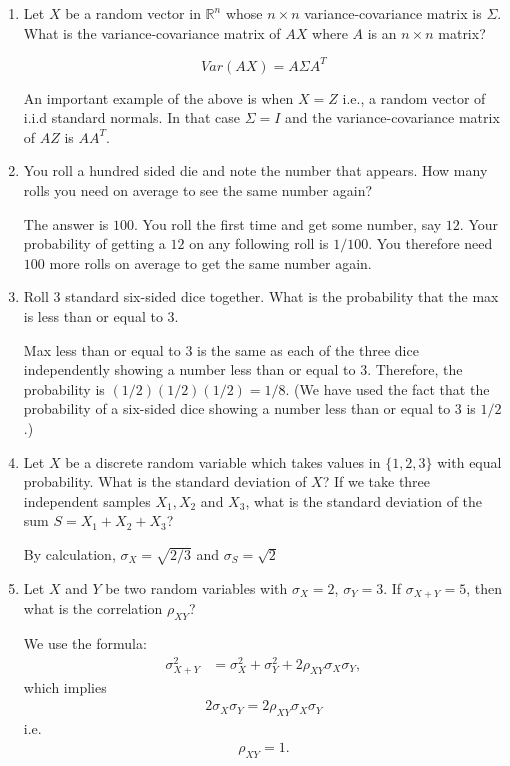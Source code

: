 \documentclass{amsart}
\theoremstyle{plain}
\numberwithin{equation}{section}
\begin{document}
\begin{enumerate}
\item Let $X$ be a random vector in $\mathbb{R}^n$ whose
$n \times n$ variance-covariance 
matrix is $\Sigma$. What is the variance-covariance matrix of 
$AX$ where $A$ is an $n \times n$ matrix?

\begin{equation*}
Var(AX) = A \Sigma A^{T}
\end{equation*}

An important example of the above is when $X=Z$ i.e.,
a random vector of i.i.d standard normals. In that case
$\Sigma = I$ and the variance-covariance matrix 
of $AZ$ is $AA^T$.

\item You roll a hundred sided die and note the number 
that appears. How many rolls you need on average 
to see the same number again?

The answer is $100$. You roll the first time and get 
some number, say $12$. Your probability of getting a $12$
on any following roll is $1/100$. You therefore need
$100$ more rolls on average to get the same number again. 

\item Roll $3$ standard six-sided dice together. What is the 
probability that the max is less than or equal to $3$.

Max less than or equal to $3$ is the same as each of the 
three dice independently showing a number less than or equal to $3$. 
Therefore, the probability is $(1/2)(1/2)(1/2) = 1/8$. (We have used the fact
that the probability of a six-sided dice showing a 
number less than or equal to $3$ is $1/2$.)

\item Let $X$ be a discrete random variable which
takes values in $\lbrace 1, 2, 3 \rbrace$ with 
equal probability. What is the standard deviation of $X$?
If we take three independent samples $X_1, X_2$ and 
$X_3$, what is the standard deviation of the sum 
$S = X_1 + X_2 + X_3$?

By calculation, $\sigma_X = \sqrt{2/3}$ and 
$\sigma_S = \sqrt{2}$

\item Let $X$ and $Y$ be two random variables with
$\sigma_X=2$, $\sigma_Y=3$. If $\sigma_{X+Y} = 5$, 
then what is the correlation $\rho_{XY}$?

We use the formula:
\begin{align*}
\sigma_{X+Y}^2 &= \sigma_{X}^2 + \sigma_{Y}^2 + 2 \rho_{XY} \sigma_X \sigma_Y,
\end{align*}
which implies
\begin{align*}
2 \sigma_X \sigma_Y = 
2 \rho_{XY} \sigma_X \sigma_Y
\end{align*}
i.e.\,
\begin{align*}
\rho_{XY} = 1.
\end{align*}


\end{enumerate}
\end{document}
